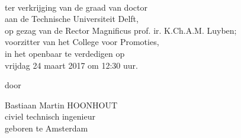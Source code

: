\begin{titlepage}
  \begin{center}
    \hfill
    
    \vspace{2cm}
    
    \begingroup
    \color{Maroon} \\ \bigskip
    \endgroup
    
    \vfill
    
    
    \vfill
    
    ter verkrijging van de graad van doctor \\
    aan de Technische Universiteit Delft, \\
    op gezag van de Rector Magnificus prof. ir. K.Ch.A.M. Luyben; \\
    voorzitter van het College voor Promoties, \\
    in het openbaar te verdedigen op \\
    vrijdag 24 maart 2017 om 12:30 uur.
    
    \vfill
    
    door
    
    \vfill
    
    Bastiaan Martin HOONHOUT \\
    civiel technisch ingenieur \\
    geboren te Amsterdam
    
    \vfill                      
    
  \end{center}  
\end{titlepage}

